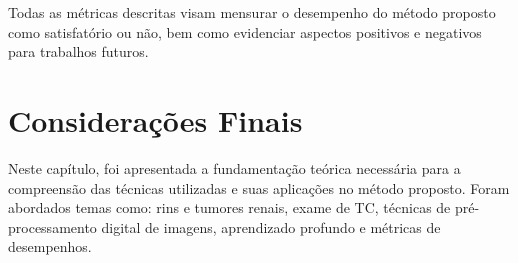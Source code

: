 Todas as métricas descritas visam mensurar o desempenho do método proposto como satisfatório ou não, bem como evidenciar aspectos positivos e negativos para trabalhos futuros.

\section{Considerações Finais}

Neste capítulo, foi apresentada a fundamentação teórica necessária para a compreensão das técnicas utilizadas e suas aplicações no método proposto. Foram abordados temas como: rins e tumores renais, exame de TC, técnicas de pré-processamento digital de imagens, aprendizado profundo e métricas de desempenhos.